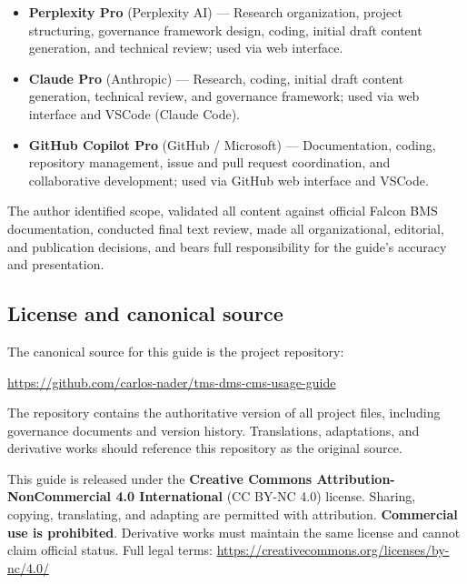 \documentclass[11pt, a4paper, twoside]{report}
\begin{document}
\begin{itemize}
	\item \textbf{Perplexity Pro} (Perplexity AI) --- Research organization, project structuring, governance framework design, coding, initial draft content generation, and technical review; used via web interface.
	\item \textbf{Claude Pro} (Anthropic) --- Research, coding, initial draft content generation, technical review, and governance framework; used via web interface and VSCode (Claude Code).
	\item \textbf{GitHub Copilot Pro} (GitHub / Microsoft) --- Documentation, coding, repository management, issue and pull request coordination, and collaborative development; used via GitHub web interface and VSCode.
\end{itemize}

The author identified scope, validated all content against official Falcon BMS documentation, conducted final text review, made all organizational, editorial, and publication decisions, and bears full responsibility for the guide's accuracy and presentation.

\subsection{License and canonical source}
\label{sec:C1-S4-S3}

The canonical source for this guide is the project repository:

\begin{center}
	\url{https://github.com/carlos-nader/tms-dms-cms-usage-guide}
\end{center}

The repository contains the authoritative version of all project files, including governance documents and version history. Translations, adaptations, and derivative works should reference this repository as the original source.

This guide is released under the \textbf{Creative Commons Attribution-NonCommercial 4.0 International} (CC BY-NC 4.0) license. Sharing, copying, translating, and adapting are permitted with attribution. \textbf{Commercial use is prohibited}. Derivative works must maintain the same license and cannot claim official status. Full legal terms: \url{https://creativecommons.org/licenses/by-nc/4.0/}
\end{document}
